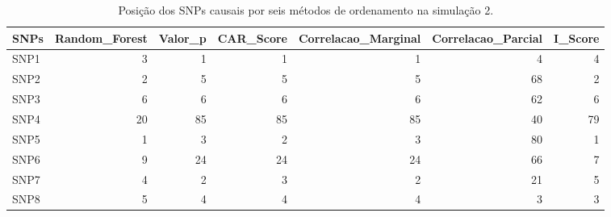 \begin{table}[ht]
\centering
\begin{tabular}{lrrrrrr}
  \hline
SNPs & Random\_Forest & Valor\_p & CAR\_Score & Correlacao\_Marginal & Correlacao\_Parcial & I\_Score \\ 
  \hline
SNP1 &   3 &   1 &   1 &   1 &   4 &   4 \\ 
  SNP2 &   2 &   5 &   5 &   5 &  68 &   2 \\ 
  SNP3 &   6 &   6 &   6 &   6 &  62 &   6 \\ 
  SNP4 &  20 &  85 &  85 &  85 &  40 &  79 \\ 
  SNP5 &   1 &   3 &   2 &   3 &  80 &   1 \\ 
  SNP6 &   9 &  24 &  24 &  24 &  66 &   7 \\ 
  SNP7 &   4 &   2 &   3 &   2 &  21 &   5 \\ 
  SNP8 &   5 &   4 &   4 &   4 &   3 &   3 \\ 
   \hline
\end{tabular}
\caption{Posição dos SNPs causais por seis métodos de ordenamento na simulação 2.} 
\label{tab:positions_causais}
\end{table}
